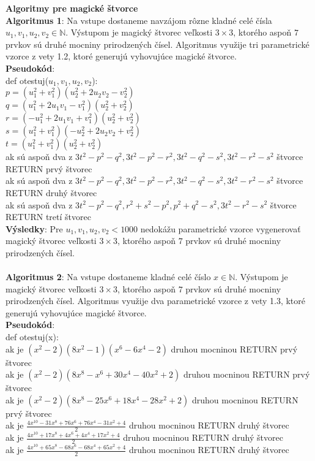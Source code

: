 \documentclass[12pt]{article}
\begin{document}
\textbf{Algoritmy pre magické štvorce} \\

\textbf{Algoritmus 1}: Na vstupe dostaneme navzájom rôzne kladné celé čísla $u_1, v_1, u_2, v_2 \in \mathbb{N}$. Výstupom je magický štvorec veľkosti $3 \times 3$, ktorého aspoň $7$ prvkov sú druhé mocniny prirodzených čísel. Algoritmus využije tri parametrické vzorce z vety 1.2, ktoré generujú vyhovujúce magické štvorce. \\

\textbf{Pseudokód}: \\
def otestuj($u_1, v_1, u_2, v_2$): \\
$p = (u_1^2 + v_1^2)(u_2^2 + 2u_2 v_2 - v_2^2)$ \\
$q = (u_1^2 + 2u_1 v_1 - v_1^2)(u_2^2 + v_2^2)$ \\
$r = (- u_1^2 + 2u_1 v_1 + v_1^2)(u_2^2 + v_2^2)$ \\
$s = (u_1^2 + v_1^2)(-u_2^2 + 2u_2 v_2 + v_2^2)$ \\
$t = (u_1^2 + v_1^2)(u_2^2 + v_2^2)$ \\
ak sú aspoň dva z $3t^2 - p^2 - q^2, 3t^2 - p^2 - r^2, 3t^2 - q^2 - s^2, 3t^2 - r^2 - s^2$ štvorce RETURN prvý štvorec \\
ak sú aspoň dva z $3t^2 - p^2 - q^2, 3t^2 - p^2 - r^2, 3t^2 - q^2 - s^2, 3t^2 - r^2 - s^2$ štvorce RETURN druhý štvorec \\
ak sú aspoň dva z $3t^2 - p^2 - q^2, r^2 + s^2 - p^2, p^2 + q^2 - s^2, 3t^2 - r^2 - s^2$ štvorce RETURN tretí štvorec \\

\textbf{Výsledky}: Pre $u_1, v_1, u_2, v_2 < 1000$ nedokážu parametrické vzorce vygenerovať magický štvorec veľkosti $3 \times 3$, ktorého aspoň $7$ prvkov sú druhé mocniny prirodzených čísel. \\\\

\textbf{Algoritmus 2}: Na vstupe dostaneme kladné celé číslo $x \in \mathbb{N}$. Výstupom je magický štvorec veľkosti $3 \times 3$, ktorého aspoň $7$ prvkov sú druhé mocniny prirodzených čísel. Algoritmus využije dva parametrické vzorce z vety 1.3, ktoré generujú vyhovujúce magické štvorce. \\

\textbf{Pseudokód}: \\
def otestuj(x): \\
ak je $(x^2 - 2)(8x^2 - 1)(x^6 - 6x^4 - 2)$ druhou mocninou RETURN prvý štvorec \\
ak je $(x^2 - 2)(8x^8 - x^6 + 30x^4 - 40x^2 + 2)$ druhou mocninou RETURN prvý štvorec \\
ak je $(x^2 - 2)(8x^8 - 25x^6 + 18x^4 - 28x^2 + 2)$ druhou mocninou RETURN prvý štvorec \\
ak je $\frac{4x^{10} - 31x^8 + 76x^6 + 76x^4 - 31x^2 + 4}{2}$ druhou mocninou RETURN druhý štvorec \\
ak je $\frac{4x^{10} + 17x^8 + 4x^6 + 4x^4 + 17x^2 + 4}{2}$ druhou mocninou RETURN druhý štvorec \\
ak je $\frac{4x^{10} + 65x^8 - 68x^6 - 68x^4 + 65x^2 + 4}{2}$ druhou mocninou RETURN druhý štvorec \\
\end{document}
